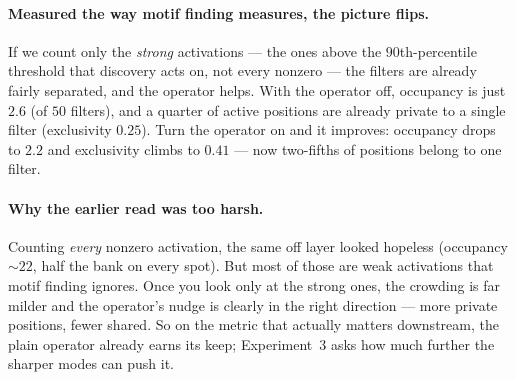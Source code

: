 \paragraph{Measured the way motif finding measures, the picture flips.} If we count only the
\emph{strong} activations --- the ones above the $90$th-percentile threshold that discovery acts
on, not every nonzero --- the filters are already fairly separated, and the operator helps. With
the operator off, occupancy is just $2.6$ (of $50$ filters), and a quarter of active positions are
already private to a single filter (exclusivity $0.25$). Turn the operator on and it improves:
occupancy drops to $2.2$ and exclusivity climbs to $0.41$ --- now two-fifths of positions belong
to one filter.

\paragraph{Why the earlier read was too harsh.} Counting \emph{every} nonzero activation, the
same off layer looked hopeless (occupancy $\sim22$, half the bank on every spot). But most of
those are weak activations that motif finding ignores. Once you look only at the strong ones, the
crowding is far milder and the operator's nudge is clearly in the right direction --- more private
positions, fewer shared. So on the metric that actually matters downstream, the plain operator
already earns its keep; Experiment~3 asks how much further the sharper modes can push it.
